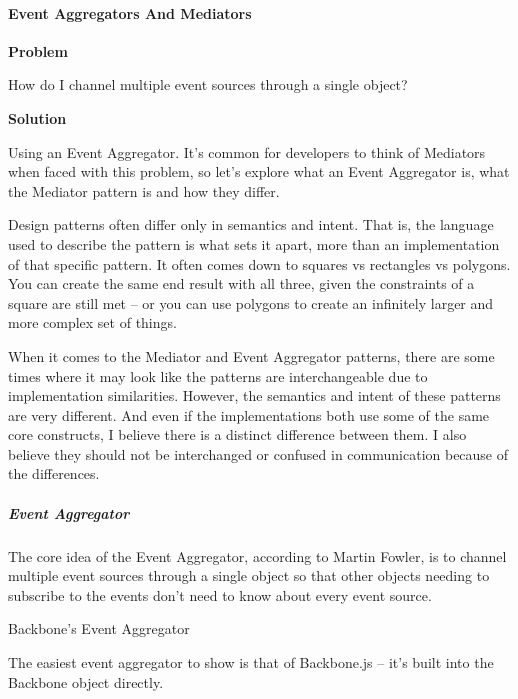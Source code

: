 \documentclass[9pt]{book}
\begin{document}
\paragraph{Event Aggregators And
Mediators}\label{event-aggregators-and-mediators}

\textbf{Problem}

How do I channel multiple event sources through a single object?

\textbf{Solution}

Using an Event Aggregator. It's common for developers to think of
Mediators when faced with this problem, so let's explore what an Event
Aggregator is, what the Mediator pattern is and how they differ.

Design patterns often differ only in semantics and intent. That is, the
language used to describe the pattern is what sets it apart, more than
an implementation of that specific pattern. It often comes down to
squares vs rectangles vs polygons. You can create the same end result
with all three, given the constraints of a square are still met -- or
you can use polygons to create an infinitely larger and more complex set
of things.

When it comes to the Mediator and Event Aggregator patterns, there are
some times where it may look like the patterns are interchangeable due
to implementation similarities. However, the semantics and intent of
these patterns are very different. And even if the implementations both
use some of the same core constructs, I believe there is a distinct
difference between them. I also believe they should not be interchanged
or confused in communication because of the differences.

\subparagraph{Event Aggregator}\label{event-aggregator}

The core idea of the Event Aggregator, according to Martin Fowler, is to
channel multiple event sources through a single object so that other
objects needing to subscribe to the events don't need to know about
every event source.

Backbone's Event Aggregator

The easiest event aggregator to show is that of Backbone.js -- it's
built into the Backbone object directly.
\end{document}

